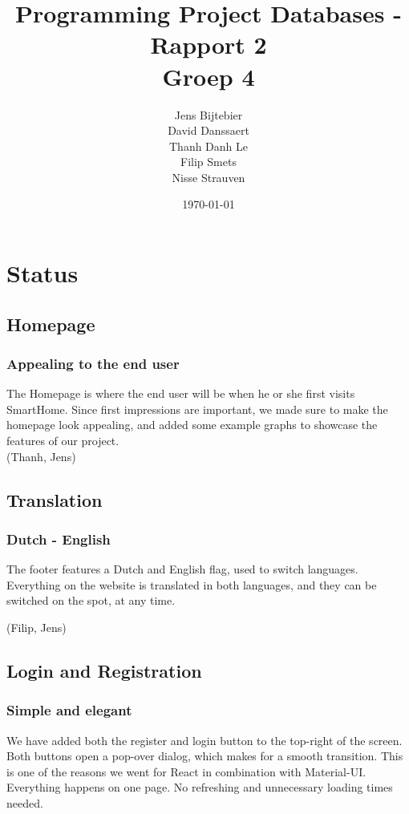 \documentclass[11pt]{article}
\title{\textbf{Programming Project Databases - Rapport 2}\\
		Groep 4}
\author{Jens Bijtebier\\
		David Danssaert\\
		Thanh Danh Le\\
		Filip Smets\\
		Nisse Strauven}
\date{\today}
\begin{document}
\maketitle


\section{Status}
  \subsection{Homepage}
	\subsubsection{Appealing to the end user}
		The Homepage is where the end user will be when he or she first visits SmartHome.
		Since first impressions are important, we made sure to make the homepage look appealing,
		and added some example graphs to showcase the features of our project.\\

		(Thanh, Jens)

  \subsection{Translation}
	\subsubsection{Dutch - English}
		The footer features a Dutch and English flag, used to switch languages.
		Everything on the website is translated in both languages, and they can be switched on the spot, at any time.

		(Filip, Jens)

  \subsection{Login and Registration}
	\subsubsection{Simple and elegant}
		We have added both the register and login button to the top-right of the screen.
		Both buttons open a pop-over dialog, which makes for a smooth transition.
		This is one of the reasons we went for React in combination with Material-UI.
		Everything happens on one page. No refreshing and unnecessary loading times needed.\\
\end{document}
